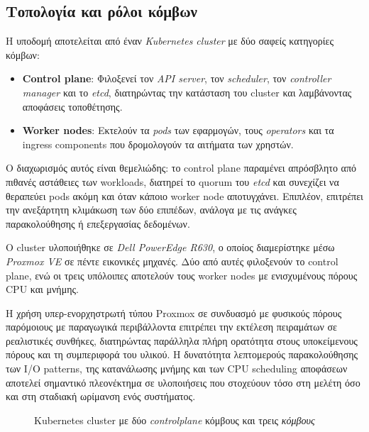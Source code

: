 \subsection{Τοπολογία και ρόλοι κόμβων}

Η υποδομή αποτελείται από έναν \textit{Kubernetes cluster} με δύο σαφείς
κατηγορίες κόμβων:

\begin{itemize}
	\item \textbf{Control plane}: Φιλοξενεί τον \textit{API server}, τον
	      \textit{scheduler}, τον \textit{controller manager} και το
	      \textit{etcd}, διατηρώντας την κατάσταση του cluster και
	      λαμβάνοντας αποφάσεις τοποθέτησης.
	\item \textbf{Worker nodes}: Εκτελούν τα \textit{pods} των εφαρμογών,
	      τους \textit{operators} και τα ingress components που
	      δρομολογούν τα αιτήματα των χρηστών.
\end{itemize}

Ο διαχωρισμός αυτός είναι θεμελιώδης: το control plane παραμένει απρόσβλητο από
πιθανές αστάθειες των workloads, διατηρεί το quorum του \textit{etcd} και
συνεχίζει να θεραπεύει pods ακόμη και όταν κάποιο worker node αποτυγχάνει.
Επιπλέον, επιτρέπει την ανεξάρτητη κλιμάκωση των δύο επιπέδων, ανάλογα με τις
ανάγκες παρακολούθησης ή επεξεργασίας δεδομένων.

Ο cluster υλοποιήθηκε σε \textit{Dell PowerEdge R630}, ο οποίος διαμερίστηκε
μέσω \textit{Proxmox VE} σε πέντε εικονικές μηχανές. Δύο από αυτές φιλοξενούν
το control plane, ενώ οι τρεις υπόλοιπες αποτελούν τους worker nodes με
ενισχυμένους πόρους CPU και μνήμης.

Η χρήση υπερ-ενορχηστρωτή τύπου Proxmox σε συνδυασμό με φυσικούς πόρους
παρόμοιους με παραγωγικά περιβάλλοντα επιτρέπει την εκτέλεση πειραμάτων σε
ρεαλιστικές συνθήκες, διατηρώντας παράλληλα πλήρη ορατότητα στους υποκείμενους
πόρους και τη συμπεριφορά του υλικού. Η δυνατότητα λεπτομερούς παρακολούθησης
των I/O patterns, της κατανάλωσης μνήμης και των CPU scheduling αποφάσεων
αποτελεί σημαντικό πλεονέκτημα σε υλοποιήσεις που στοχεύουν τόσο στη μελέτη όσο
και στη σταδιακή ωρίμανση ενός συστήματος.

\begin{figure}[H]
	\centering
	\makebox[\textwidth]{%
	}
	\caption{Kubernetes cluster με δύο \textit{controlplane} κόμβους και τρεις
		\textit{κόμβους}}
	\label{fig:cluster}
\end{figure}

